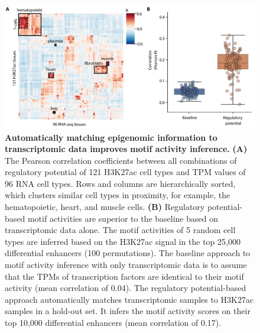 \begin{figure}[h]
    \centering
    \includegraphics[width=1.0\linewidth]{ch.scepia/imgs/CellTypes_MvS_Myriad_removeGreenBox1_centered_Figure1.png}
    \caption{\textbf{Automatically matching epigenomic information to transcriptomic data improves motif activity inference.} \textbf{(A)} The Pearson correlation coefficients between all combinations of regulatory potential of 121 H3K27ac cell types and TPM values of 96 RNA cell types. Rows and columns are hierarchically sorted, which clusters similar cell types in proximity, for example, the hematopoietic, heart, and muscle cells. \textbf{(B)} Regulatory potential-based motif activities are superior to the baseline based on transcriptomic data alone. The motif activities of 5 random cell types are inferred based on the H3K27ac signal in the top 25,000 differential enhancers (100 permutations). The baseline approach to motif activity inference with only transcriptomic data is to assume that the TPMs of transcription factors are identical to their motif activity (mean correlation of 0.04). The regulatory potential-based approach automatically matches transcriptomic samples to H3K27ac samples in a hold-out set. It infers the motif activity scores on their top 10,000 differential enhancers (mean correlation of 0.17).}
    \label{fig:bulk_comparison}
\end{figure}

